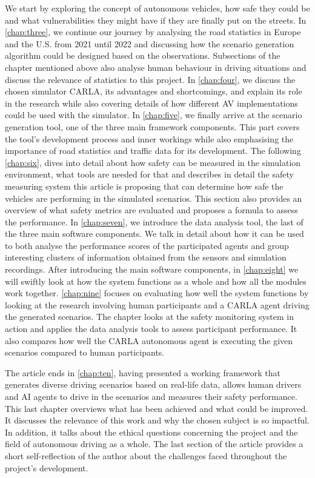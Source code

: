 We start by exploring the concept of autonomous vehicles, how safe they could be and what vulnerabilities they might have if they are finally put on the streets. In \autoref{chap:three}, we continue our journey by analysing the road statistics in Europe and the U.S. from 2021 until 2022 and discussing how the scenario generation algorithm could be designed based on the observations. Subsections of the chapter mentioned above also analyse human behaviour in driving situations and discuss the relevance of statistics to this project. In \autoref{chap:four}, we discuss the chosen simulator CARLA, its advantages and shortcomings, and explain its role in the research while also covering details of how different AV implementations could be used with the simulator. In \autoref{chap:five}, we finally arrive at the scenario generation tool, one of the three main framework components. This part covers the tool's development process and inner workings while also emphasising the importance of road statistics and traffic data for its development. The following \autoref{chap:six}, dives into detail about how safety can be measured in the simulation environment, what tools are needed for that and describes in detail the safety measuring system this article is proposing that can determine how safe the vehicles are performing in the simulated scenarios. This section also provides an overview of what safety metrics are evaluated and proposes a formula to assess the performance. In \autoref{chap:seven}, we introduce the data analysis tool, the last of the three main software components. We talk in detail about how it can be used to both analyse the performance scores of the participated agents and group interesting clusters of information obtained from the sensors and simulation recordings. After introducing the main software components, in \autoref{chap:eight} we will swiftly look at how the system functions as a whole and how all the modules work together. \autoref{chap:nine} focuses on evaluating how well the system functions by looking at the research involving human participants and a CARLA agent driving the generated scenarios. The chapter looks at the safety monitoring system in action and applies the data analysis tools to assess participant performance. It also compares how well the CARLA autonomous agent is executing the given scenarios compared to human participants.

The article ends in \autoref{chap:ten}, having presented a working framework that generates diverse driving scenarios based on real-life data, allows human drivers and AI agents to drive in the scenarios and measures their safety performance. This last chapter overviews what has been achieved and what could be improved. It discusses the relevance of this work and why the chosen subject is so impactful. In addition, it talks about the ethical questions concerning the project and the field of autonomous driving as a whole. The last section of the article provides a short self-reflection of the author about the challenges faced throughout the project's development.